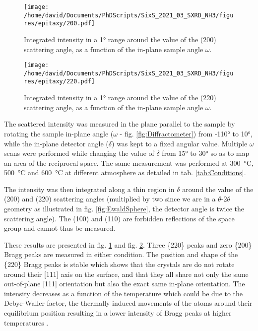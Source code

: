 
\begin{figure}[!htb]
    \centering
    \texttt{[image: /home/david/Documents/PhDScripts/SixS\_2021\_03\_SXRD\_NH3/figures/epitaxy/200.pdf]}
    \caption{
        Integrated intensity in a \ang{1} range around the value of the (200) scattering angle, as a function of the in-plane sample angle $\omega$.
    }
    \label{fig:Epitaxy200}
\end{figure}

\begin{figure}[!htb]
    \centering
    \texttt{[image: /home/david/Documents/PhDScripts/SixS\_2021\_03\_SXRD\_NH3/figures/epitaxy/220.pdf]}
    \caption{
        Integrated intensity in a \ang{1} range around the value of the (220) scattering angle, as a function of the in-plane sample angle $\omega$.
    }
    \label{fig:Epitaxy220}
\end{figure}

The scattered intensity was measured in the plane parallel to the sample by rotating the sample in-plane angle ($\omega$ - fig. \ref{fig:Diffractometer}) from \ang{-110} to \ang{10}, while the in-plane detector angle ($\delta$) was kept to a fixed angular value.
Multiple $\omega$ scans were performed while changing the value of $\delta$ from \ang{15} to \ang{30} so as to map an area of the reciprocal space.
The same measurement was performed at \qty{300}{\degreeCelsius}, \qty{500}{\degreeCelsius} and \qty{600}{\degreeCelsius} at different atmosphere as detailed in tab. \ref{tab:Conditions}.

The intensity was then integrated along a thin region in $\delta$ around the value of the (200) and (220) scattering angles (multiplied by two since we are in a $\theta$-$2\theta$ geometry as illustrated in fig. \ref{fig:EwaldSphere}, the detector angle is twice the scattering angle).
The (100) and (110) are forbidden reflections of the space group and cannot thus be measured.

These results are presented in fig. \ref{fig:Epitaxy200} and fig. \ref{fig:Epitaxy220}.
Three \{220\} peaks and zero \{200\} Bragg peaks are measured in either condition.
The position and shape of the \{220\} Bragg peaks is stable which shows that the crystals are do not rotate around their [111] axis on the surface, and that they all share not only the same out-of-plane [111] orientation but also the exact same in-plane orientation.
The intensity decreases as a function of the temperature which could be due to the Debye-Waller factor, the thermally induced movements of the atoms around their equilibrium position resulting in a lower intensity of Bragg peaks at higher temperatures \parencite{Willmott}.


